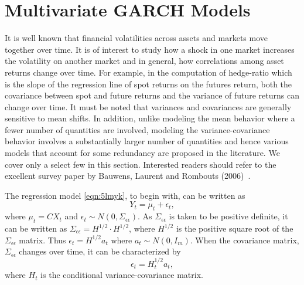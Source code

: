 \section{Multivariate GARCH Models}


It is well known that financial volatilities across assets and markets move together over time. It is of interest to study how a shock in one market increases the volatility on another market and in general, how correlations among asset returns change over time. For example, in the computation of hedge-ratio which is the slope of the regression line of spot returns on the futures return, both the covariance between spot and future returns and the variance of future returns can change over time. It must be noted that variances and covariances are generally sensitive to mean shifts. In addition, unlike modeling the mean behavior where a fewer number of quantities are involved, modeling the variance-covariance behavior involves a substantially larger number of quantities and hence various models that account for some redundancy are proposed in the literature. We cover only a select few in this section. Interested readers should refer to the excellent survey paper by Bauwens, Laurent and Rombouts (2006)~\cite{laurent}.


The regression model \eqref{eqn:5lmyk}, to begin with, can be written as
	\begin{equation} \label{eqn:3relabel}
	Y_t= \mu_t+\epsilon_t,
	\end{equation}
where $\mu_t=CX_t$ and $\epsilon_t \sim N(0,\Sigma_{\epsilon\epsilon})$. As $\Sigma_{\epsilon\epsilon}$ is taken to be positive definite, it can be written as $\Sigma_{\epsilon\epsilon}= H^{1/2} \cdot H^{1/2}$, where $H^{1/2}$ is the positive square root of the $\Sigma_{\epsilon\epsilon}$ matrix. Thus $\epsilon_t= H^{1/2} a_t$ where $a_t \sim N(0,I_m)$. When the covariance matrix, $\Sigma_{\epsilon\epsilon}$ changes over time, it can be characterized by
	\begin{equation}
	\epsilon_t=H^{1/2}_t a_t,
	\end{equation}
where $H_t$ is the conditional variance-covariance matrix.


